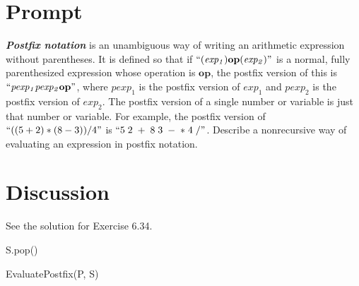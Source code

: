\documentclass[11pt]{article}
\begin{document}
    \section*{Prompt}\label{sec:prompt}

\textbf{\textit{Postfix notation}} is an unambiguous way of writing an arithmetic expression without parentheses.
    It is defined so that if $``(\mathit{exp_1})\mathbf{op}(\mathit{exp_2})"$ is a
normal, fully parenthesized expression whose operation is $\mathbf{op}$, the postfix
version of this is $``\mathit{pexp_1} \mathit{pexp_2} \mathbf{op}"$, where $\mathit{pexp_1}$ is the postfix version of
$\mathit{exp_1}$ and $\mathit{pexp_2}$ is the postfix version of $\mathit{exp_2}$. The postfix version of a single number or
    variable is just that number or variable. For example, the
postfix version of $``((5+2) \ast (8-3))/4"$ is $``5 \; 2 \; + \; 8 \; 3 \; - \; \ast \; 4 \; /"$. Describe
a nonrecursive way of evaluating an expression in postfix notation.

    \pagebreak

    \section*{Discussion}\label{sec:discussion}
    See the solution for Exercise 6.34.

    \begin{algorithm}
    \BlankLine
    \SetAlgoNoLine
    \BlankLine
    \KwRet S.pop()
    \caption{EvaluatePostfix(P, S)}
    \end{algorithm}
\end{document}
